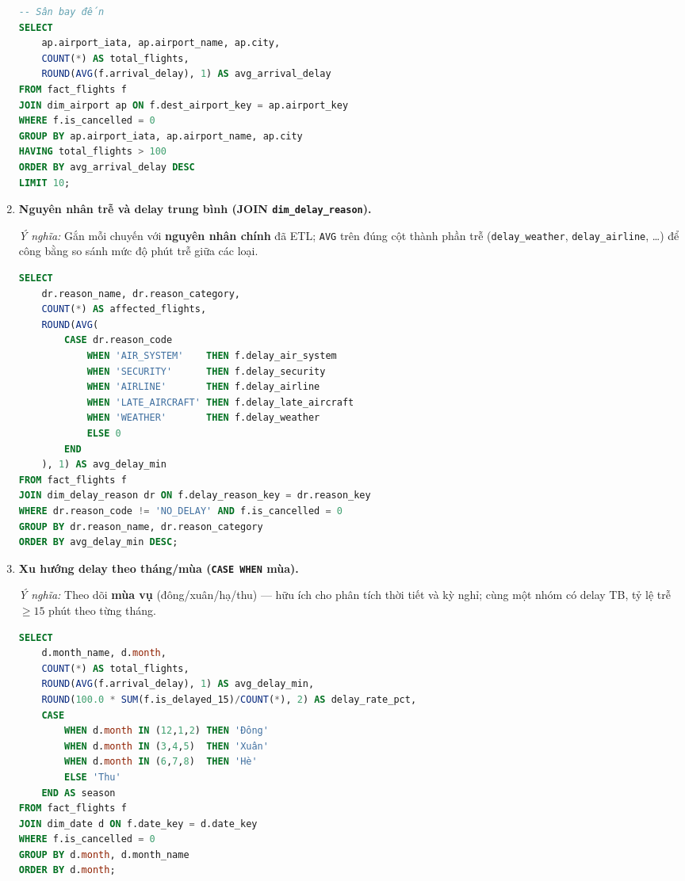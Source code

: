 \begin{enumerate}
\begin{lstlisting}[language=SQL, basicstyle=\ttfamily\scriptsize]
-- Sân bay đến
SELECT
    ap.airport_iata, ap.airport_name, ap.city,
    COUNT(*) AS total_flights,
    ROUND(AVG(f.arrival_delay), 1) AS avg_arrival_delay
FROM fact_flights f
JOIN dim_airport ap ON f.dest_airport_key = ap.airport_key
WHERE f.is_cancelled = 0
GROUP BY ap.airport_iata, ap.airport_name, ap.city
HAVING total_flights > 100
ORDER BY avg_arrival_delay DESC
LIMIT 10;
\end{lstlisting}

  \item \textbf{Nguyên nhân trễ và delay trung bình (JOIN \texttt{dim\_delay\_reason}).}

  \emph{Ý nghĩa:} Gắn mỗi chuyến với \textbf{nguyên nhân chính} đã ETL; \texttt{AVG} trên đúng cột thành phần trễ
  (\texttt{delay\_weather}, \texttt{delay\_airline}, \ldots) để công bằng so sánh mức độ phút trễ giữa các loại.

\begin{lstlisting}[language=SQL, basicstyle=\ttfamily\scriptsize]
SELECT
    dr.reason_name, dr.reason_category,
    COUNT(*) AS affected_flights,
    ROUND(AVG(
        CASE dr.reason_code
            WHEN 'AIR_SYSTEM'    THEN f.delay_air_system
            WHEN 'SECURITY'      THEN f.delay_security
            WHEN 'AIRLINE'       THEN f.delay_airline
            WHEN 'LATE_AIRCRAFT' THEN f.delay_late_aircraft
            WHEN 'WEATHER'       THEN f.delay_weather
            ELSE 0
        END
    ), 1) AS avg_delay_min
FROM fact_flights f
JOIN dim_delay_reason dr ON f.delay_reason_key = dr.reason_key
WHERE dr.reason_code != 'NO_DELAY' AND f.is_cancelled = 0
GROUP BY dr.reason_name, dr.reason_category
ORDER BY avg_delay_min DESC;
\end{lstlisting}

  \item \textbf{Xu hướng delay theo tháng/mùa (\texttt{CASE WHEN} mùa).}

  \emph{Ý nghĩa:} Theo dõi \textbf{mùa vụ} (đông/xuân/hạ/thu) --- hữu ích cho phân tích thời tiết và kỳ nghỉ;
  cùng một nhóm có delay TB, tỷ lệ trễ $\geq 15$ phút theo từng tháng.

\begin{lstlisting}[language=SQL, basicstyle=\ttfamily\scriptsize]
SELECT
    d.month_name, d.month,
    COUNT(*) AS total_flights,
    ROUND(AVG(f.arrival_delay), 1) AS avg_delay_min,
    ROUND(100.0 * SUM(f.is_delayed_15)/COUNT(*), 2) AS delay_rate_pct,
    CASE
        WHEN d.month IN (12,1,2) THEN 'Đông'
        WHEN d.month IN (3,4,5)  THEN 'Xuân'
        WHEN d.month IN (6,7,8)  THEN 'Hè'
        ELSE 'Thu'
    END AS season
FROM fact_flights f
JOIN dim_date d ON f.date_key = d.date_key
WHERE f.is_cancelled = 0
GROUP BY d.month, d.month_name
ORDER BY d.month;
\end{lstlisting}


\end{enumerate}
